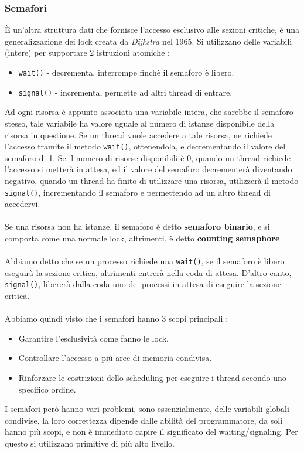 \documentclass[12pt, letterpaper]{article}
\newcommand{\code}[1]{\colorbox{light-gray}{\texttt{#1}}}
\newcommand{\acc}{\\\hphantom{}\\}
\begin{document}
\subsubsection{Semafori}
È un'altra struttura dati che fornisce l'accesso esclusivo alle sezioni critiche, è una generalizzazione dei lock 
creata da \textit{Dijkstra} nel 1965. Si utilizzano delle variabili (intere) per supportare 2 
istruzioni atomiche :\begin{itemize}
    \item \code{wait()} - decrementa, interrompe finchè il semaforo è libero. 
    \item \code{signal()}  - incrementa, permette ad altri thread di entrare. 
\end{itemize}
Ad ogni risorsa è appunto associata una variabile intera, che sarebbe il semaforo stesso, tale variabile ha valore uguale al numero di 
istanze disponibile della risorsa in questione. Se un thread vuole accedere a tale risorsa, ne richiede l'accesso tramite il metodo 
\code{wait()}, ottenendola, e decrementando il valore del semaforo di 1. Se il numero di risorse disponibili è 0, quando un thread richiede 
l'accesso si metterà in attesa, ed il valore del semaforo decrementerà diventando negativo, quando un thread ha finito di utilizzare una risorsa, 
utilizzerà il metodo \code{signal()}, incrementando il semaforo e permettendo ad un altro thread di accedervi.  \acc 
Se una risorsa non ha istanze, il semaforo è detto \textbf{semaforo binario}, e si comporta come una normale lock, 
altrimenti, è detto \textbf{counting semaphore}.\acc 
Abbiamo detto che se un processo richiede una \code{wait()}, se il semaforo è libero eseguirà la sezione critica, altrimenti 
entrerà nella coda di attesa. D'altro canto, \code{signal()}, libererà dalla coda uno dei processi in attesa di 
eseguire la sezione critica.\acc 
Abbiamo quindi visto che i semafori hanno 3 scopi principali : \begin{itemize}
    \item Garantire l'esclusività come fanno le lock.
    \item Controllare l'accesso a più aree di memoria condivisa. 
    \item Rinforzare le costrizioni dello scheduling per eseguire i thread secondo uno specifico ordine.
\end{itemize}
I semafori però hanno vari problemi, sono essenzialmente, delle variabili globali condivise, la loro correttezza dipende 
dalle abilità del programmatore, da soli hanno più scopi, e non è immediato capire il significato del waiting\slash signaling.
Per questo si utilizzano primitive di più alto livello.
\end{document}
